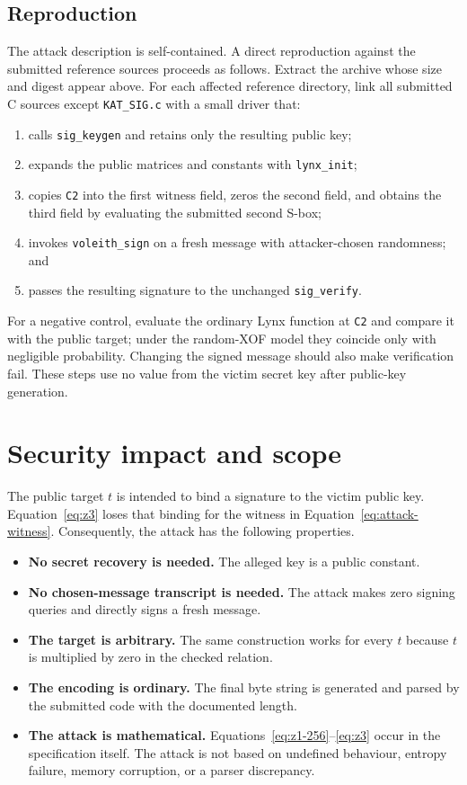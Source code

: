 \documentclass[11pt,a4paper]{article}
\begin{document}
\subsection{Reproduction}

The attack description is self-contained.  A direct reproduction against the submitted
reference sources proceeds as follows.  Extract the archive whose
size and digest appear above.  For each affected reference directory, link all
submitted C sources except \texttt{KAT\_SIG.c} with a small driver that:
\begin{enumerate}[leftmargin=1.7em]
  \item calls \texttt{sig\_keygen} and retains only the resulting public key;
  \item expands the public matrices and constants with \texttt{lynx\_init};
  \item copies \texttt{C2} into the first witness field, zeros the second field,
        and obtains the third field by evaluating the submitted second S-box;
  \item invokes \texttt{voleith\_sign} on a fresh message with attacker-chosen
        randomness; and
  \item passes the resulting signature to the unchanged \texttt{sig\_verify}.
\end{enumerate}
For a negative control, evaluate the ordinary Lynx function at \texttt{C2} and compare it
with the public target; under the random-XOF model they coincide only with negligible
probability.  Changing the signed message should also make verification fail.
These steps use no value from the victim secret key after public-key generation.

\section{Security impact and scope}

The public target $t$ is intended to bind a signature to the victim public key.  Equation~\eqref{eq:z3}
loses that binding for the witness in Equation~\eqref{eq:attack-witness}.  Consequently, the
attack has the following properties.
\begin{itemize}[leftmargin=1.7em]
  \item \textbf{No secret recovery is needed.}  The alleged key is a public constant.
  \item \textbf{No chosen-message transcript is needed.}  The attack makes zero signing
        queries and directly signs a fresh message.
  \item \textbf{The target is arbitrary.}  The same construction works for every $t$ because
        $t$ is multiplied by zero in the checked relation.
  \item \textbf{The encoding is ordinary.}  The final byte string is generated and parsed by
        the submitted code with the documented length.
  \item \textbf{The attack is mathematical.}  Equations~\eqref{eq:z1-256}--\eqref{eq:z3}
        occur in the specification itself.  The attack is not based on undefined behaviour,
        entropy failure, memory corruption, or a parser discrepancy.
\end{itemize}
\end{document}
